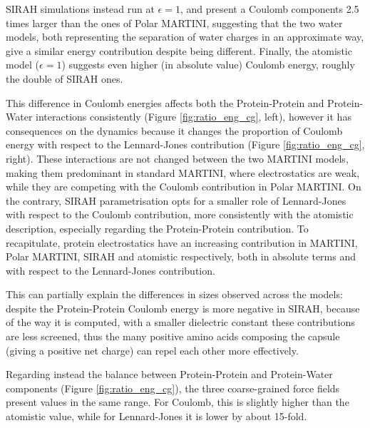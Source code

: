 SIRAH simulations instead run at $\epsilon = 1$, and present a Coulomb components 2.5 times larger than the ones of Polar MARTINI, suggesting that the two water models, both representing the separation of water charges in an approximate way, give a similar energy contribution despite being different.
%
Finally, the atomistic model ($\epsilon = 1$) suggests even higher (in absolute value) Coulomb energy, roughly the double of SIRAH ones.


This difference in Coulomb energies affects both the Protein-Protein and Protein-Water interactions consistently (Figure \ref{fig:ratio_eng_cg}, left), however it has consequences on the dynamics because it changes the proportion of Coulomb energy with respect to the Lennard-Jones contribution (Figure \ref{fig:ratio_eng_cg}, right). These interactions are not changed between the two MARTINI models, making them predominant in standard MARTINI, where electrostatics are weak, while they are competing with the Coulomb contribution in Polar MARTINI.
%
On the contrary, SIRAH parametrisation opts for a smaller role of Lennard-Jones with respect to the Coulomb contribution, more consistently with the atomistic description, especially regarding the Protein-Protein contribution.
%
To recapitulate, protein electrostatics have an increasing contribution in MARTINI, Polar MARTINI, SIRAH and atomistic respectively, both in absolute terms and with respect to the Lennard-Jones contribution.

This can partially explain the differences in sizes observed across the models: despite the Protein-Protein Coulomb energy is more negative in SIRAH, because of the way it is computed, with a smaller dielectric constant these contributions are less screened, thus the many positive amino acids composing the capsule (giving a positive net charge) can repel each other more effectively.

Regarding instead the balance between Protein-Protein and Protein-Water components (Figure \ref{fig:ratio_eng_cg}), the three coarse-grained force fields present values in the same range.
%
For Coulomb, this is slightly higher than the atomistic value, while for Lennard-Jones it is lower by about 15-fold.

